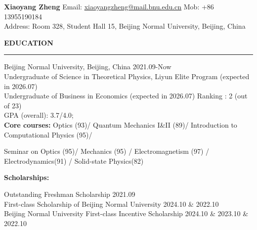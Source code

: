 \documentclass[10pt]{article}
\newcommand{\cvsection}[1]{%
    \vspace{8pt}%
    \noindent\textbf{\Large #1}\\[-0.5\baselineskip]%
    \rule{\linewidth}{0.4pt}%
    \vspace{0.5\baselineskip}%
}
\newenvironment{cvsubsectionblock}[1]{%
    \noindent \textbf{#1:}\\%
    \begin{list}{}{\setlength{\leftmargin}{0.5cm}\setlength{\itemsep}{0pt}\setlength{\parsep}{0pt}\setlength{\topsep}{0pt}\setlength{\partopsep}{0pt}}%
    \item\relax %
    \vspace{-\baselineskip}%
}{\end{list}}
\begin{document}
\vspace*{-0.5in} %

\begin{center}
    \Huge\textbf{Xiaoyang Zheng}\vspace{5pt} %
    \normalsize Email: \href{mailto:xiaoyangzheng@mail.bnu.edu.cn}{xiaoyangzheng@mail.bnu.edu.cn} \quad Mob: +86 13955190184\\
    Address: Room 328, Student Hall 15, Beijing Normal University, Beijing, China
\end{center}
\vspace{10pt} %

\cvsection{EDUCATION}

\noindent Beijing Normal University, Beijing, China \hfill 2021.09-Now\\
\hspace*{0.5cm}Undergraduate of Science in Theoretical Physics, Liyun Elite Program \hfill (expected in 2026.07)\\
\hspace*{0.5cm}Undergraduate of Business in Economics \hfill (expected in 2026.07)\vspace{0pt}%
\noindent Ranking : 2 (out of 23)\\
\noindent GPA (overall): 3.7/4.0;\\
\noindent\RaggedRight\textbf{Core courses:} Optics (93)/ Quantum Mechanics I\&II (89)/ Introduction to Computational Physics (95)/%
\par\hangindent=1.3cm Seminar on Optics (95)/ Mechanics (95) / Electromagnetism (97) / Electrodynamics(91) / Solid-state Physics(82)\vspace{5pt}

\begin{cvsubsectionblock}{Scholarships}
    Outstanding Freshman Scholarship \hfill 2021.09\\
    First-class Scholarship of Beijing Normal University \hfill 2024.10 \& 2022.10\\
    Beijing Normal University First-class Incentive Scholarship \hfill 2024.10 \& 2023.10 \& 2022.10
\end{cvsubsectionblock}\vspace{5pt}
\end{document}
